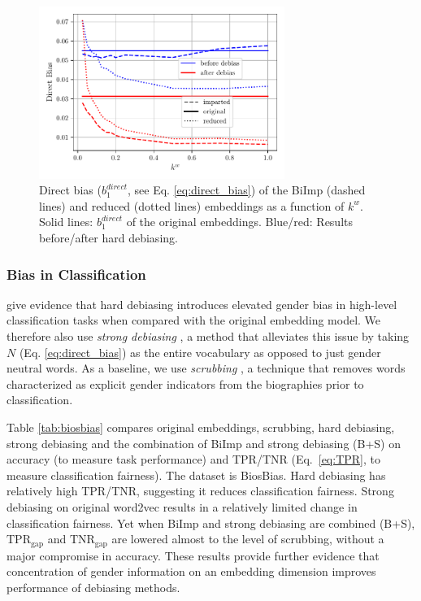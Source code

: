 \documentclass[11pt,a4paper]{article}
\def\proposedmethod{BiImp}
\begin{document}
\begin{figure}
	\centering
	\includegraphics[width=8.0cm]{Figures/gender_bias_reduction.pdf}
	\caption{Direct bias
          ($b^{direct}_1$, see Eq. \ref{eq:direct_bias})
of the \proposedmethod{}
          (dashed lines) and reduced 
          (dotted lines) embeddings as a function of $k^w$. Solid lines:
          $b^{direct}_1$
 of the original embeddings. Blue/red: Results before/after
 hard debiasing.}
	\label{fig:bias}
\end{figure}

\subsubsection{Bias in Classification}

\citet{prost19biasTextClassif} give evidence that hard debiasing  introduces elevated
gender bias in high-level classification tasks when compared
with the original embedding model.
We therefore also use 
\textit{strong debiasing} \citep{prost19biasTextClassif},
a method that alleviates this issue
by taking $N$ (Eq. \ref{eq:direct_bias}) as the entire
vocabulary as opposed to just gender neutral words.
As a baseline, we use \emph{scrubbing}
\citep{de19biosbias}, a technique that removes words characterized as
explicit gender indicators from the biographies prior to
classification.

Table \ref{tab:biosbias} compares
original embeddings, scrubbing, hard debiasing, strong
debiasing and the combination of \proposedmethod{} and
strong debiasing (B+S) on accuracy
(to measure task performance)
and TPR/TNR (Eq.\ \ref{eq:TPR}, to measure classification fairness).
The dataset is BiosBias.
Hard debiasing
has relatively high TPR/TNR, suggesting it
reduces classification fairness.
Strong debiasing 
on  original word2vec results in a relatively limited
change in classification fairness. Yet when
\proposedmethod{} and
strong debiasing are combined
(B+S),
$\text{TPR}_{\text{gap}}$ and $\text{TNR}_{\text{gap}}$
are lowered almost to the level of scrubbing,
without a major compromise in accuracy. These results
provide further evidence that concentration of gender
information on an embedding dimension improves performance
of debiasing methods.
\end{document}
